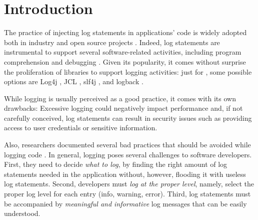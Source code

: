 \section{Introduction} \label{sec:intro}



The practice of injecting log statements in applications' code is widely adopted both in industry and open source projects \cite{oliner2012advances}. Indeed, log statements are instrumental to support several software-related activities, including program comprehension and debugging \cite{lu2017log,gurumdimma2016crude}. Given its popularity, it comes without surprise the proliferation of libraries to support logging activities: just for \java, some possible options are Log4j \cite{log4j}, JCL \cite{jcl}, slf4j \cite{slf4j}, and logback \cite{logback}.

While logging is usually perceived as a good practice, it comes with its own drawbacks: Excessive logging could negatively impact performance and, if not carefully conceived, log statements can result in security issues such as providing access to user credentials or sensitive information. 

Also, researchers documented several bad practices that should be avoided while logging code \cite{Chen:icse2017,Li:icse2019}. 
In general, logging poses several challenges to software developers. First, they need to decide \emph{what to log}, by finding the right amount of log statements needed in the application without, however, flooding it with useless log statements. Second, developers must \emph{log at the proper level}, namely, select the proper log level for each entry (\eg info, warning, error). Third, log statements must be accompanied by \emph{meaningful and informative} log messages that can be easily understood.

